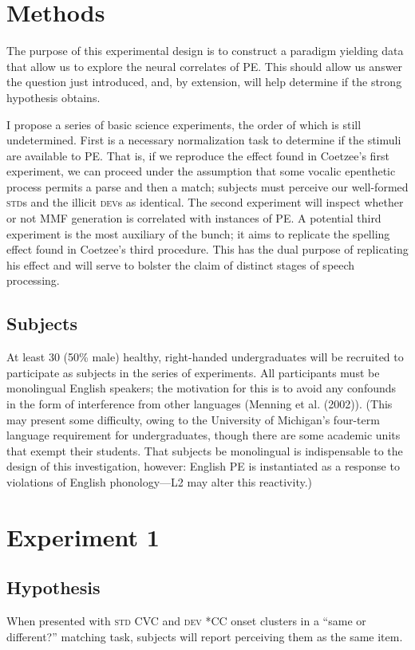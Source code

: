 \documentclass[jou,apacite]{apa6}
\begin{document}
\section{Methods}

The purpose of this experimental design is to construct a paradigm yielding data that allow us to explore the neural correlates of PE. This should allow us answer the question just introduced, and, by extension, will help determine if the strong hypothesis obtains.

I propose a series of basic science experiments, the order of which is still undetermined. First is a necessary normalization task to determine if the stimuli are available to PE. That is, if we reproduce the effect found in Coetzee’s first experiment, we can proceed under the assumption that some vocalic epenthetic process permits a parse and then a match; subjects must perceive our well-formed \textsc{std}s and the illicit \textsc{dev}s as identical. The second experiment will inspect whether or not MMF generation is correlated with instances of PE. A potential third experiment is the most auxiliary of the bunch; it aims to replicate the spelling effect found in Coetzee’s third procedure. This has the dual purpose of replicating his effect and will serve to bolster the claim of distinct stages of speech processing.

    \subsection{Subjects}
    At least 30 (50\% male) healthy, right-handed undergraduates will be recruited to participate as subjects in the series of experiments. All participants must be monolingual English speakers; the motivation for this is to avoid any confounds in the form of interference from other languages (Menning et al. (2002)). (This may present some difficulty, owing to the University of Michigan’s four-term language requirement for undergraduates, though there are some academic units that exempt their students. That subjects be monolingual is indispensable to the design of this investigation, however: English PE is instantiated as a response to violations of English phonology—L2 may alter this reactivity.)

\section{Experiment 1}
    \subsection{Hypothesis}
    When presented with \textsc{std} CVC and \textsc{dev} *CC onset clusters in a “same or different?” matching task, subjects will report perceiving them as the same item.
\end{document}
